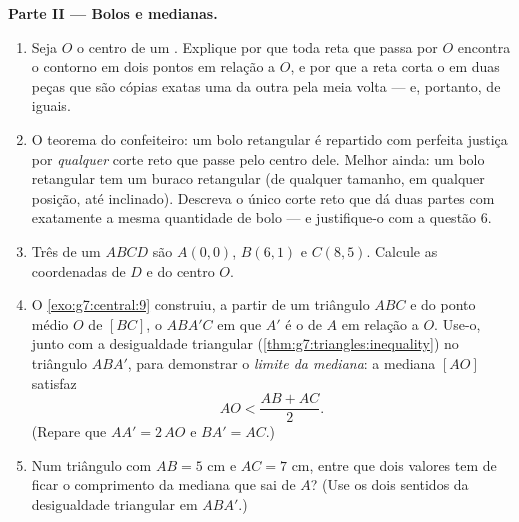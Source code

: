 \begin{problem}
\medskip
\noindent\textbf{Parte II --- Bolos e medianas.}
\begin{enumerate}[resume]
  \item Seja $O$ o centro de um . Explique por que toda
        reta que passa por $O$ encontra o contorno em dois pontos
         em relação a $O$, e por que a reta corta o
         em duas peças que são cópias exatas uma da outra
        pela meia volta --- e, portanto, de  iguais.
  \item O teorema do confeiteiro: um bolo retangular é repartido com
        perfeita justiça por \emph{qualquer} corte reto que passe pelo
        centro dele. Melhor ainda: um bolo retangular tem um buraco
        retangular (de qualquer tamanho, em qualquer posição, até
        inclinado). Descreva o único corte reto que dá duas partes com
        exatamente a mesma quantidade de bolo --- e justifique-o com a
        questão 6.
  \item Três  de um  $ABCD$ são $A(0, 0)$,
        $B(6, 1)$ e $C(8, 5)$. Calcule as coordenadas de $D$ e do
        centro $O$.
  \item O \cref{exo:g7:central:9} construiu, a partir de um triângulo
        $ABC$ e do ponto médio $O$ de $[BC]$, o  $ABA'C$
        em que $A'$ é o  de $A$ em relação a $O$. Use-o, junto
        com a desigualdade triangular
        (\cref{thm:g7:triangles:inequality}) no triângulo $ABA'$, para
        demonstrar o \emph{limite da mediana}: a mediana $[AO]$
        satisfaz
        \[
        AO < \frac{AB + AC}{2} .
        \]
        (Repare que $AA' = 2\,AO$ e $BA' = AC$.)
  \item Num triângulo com $AB = 5$ cm e $AC = 7$ cm, entre que dois
        valores tem de ficar o comprimento da mediana que sai de $A$?
        (Use os dois sentidos da desigualdade triangular em $ABA'$.)
\end{enumerate}


\end{problem}

